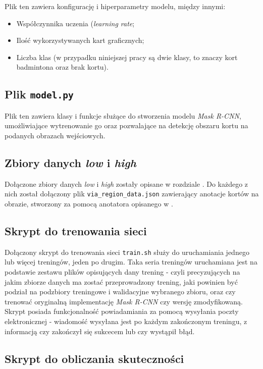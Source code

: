 Plik ten zawiera konfigurację i hiperparametry modelu, między innymi:
\begin{itemize}
  \item Współczynnika uczenia (\textit{learning rate};
  \item Ilość wykorzystywanych kart graficznych;
  \item Liczba klas (w przypadku niniejszej pracy są dwie klasy, to znaczy kort badmintona oraz brak kortu).
\end{itemize}

\subsection*{Plik \texttt{model.py}}

Plik ten zawiera klasy i funkcje służące do stworzenia modelu \textit{Mask R-CNN}, umożliwiające wytrenowanie go oraz pozwalające na detekcję obszaru kortu na podanych obrazach wejściowych.

\subsection*{Zbiory danych \textit{low} i \textit{high}}

Dołączone zbiory danych \textit{low} i \textit{high} zostały opisane w rozdziale .
Do każdego z nich został dołączony plik \texttt{via\_region\_data.json} zawierający anotacje kortów na obrazie, stworzony za pomocą anotatora opisanego w .

\subsection*{Skrypt do trenowania sieci}

Dołączony skrypt do trenowania sieci \texttt{train.sh} służy do uruchamiania jednego lub więcej treningów, jeden po drugim. Taka seria treningów uruchamiana jest na podstawie zestawu plików opisujących dany trening - czyli precyzujących na jakim zbiorze danych ma zostać przeprowadzony trening, jaki powinien być podział na podzbiory treningowe i walidacyjne wybranego zbioru, oraz czy trenować oryginalną implementację \textit{Mask R-CNN} czy wersję zmodyfikowaną. Skrypt posiada funkcjonalność powiadamiania za pomocą wysyłania poczty elektronicznej - wiadomość wysyłana jest po każdym zakończonym treningu, z informacją czy zakończył się sukcecem lub czy wystąpił błąd.

\subsection*{Skrypt do obliczania skuteczności}

